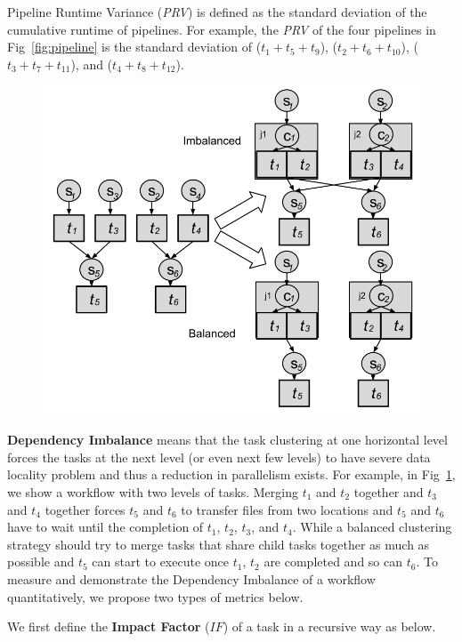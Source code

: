 Pipeline Runtime Variance ({\em PRV}) is defined as the standard deviation of the cumulative runtime of pipelines. For example, the {\em PRV} of the four pipelines in Fig~\ref{fig:pipeline} is the standard deviation of ($t_1+ t_5 +t_9$), ($t_2+t_6+t_{10}$), ($t_3 +t_7+t_{11}$), and ($t_4+t_8+t_{12}$).


\begin{figure}
\centering

  \includegraphics[width=0.8\linewidth]{figures/balance/dv.png}
  \label{fig:dv}
\end{figure}
\textbf{Dependency Imbalance} means that the task clustering at one horizontal level forces the tasks at the next level (or even next few levels) to have severe data locality problem and thus a reduction in parallelism exists. For example, in Fig~\ref{fig:dv}, we show a workflow with two levels of tasks. Merging $t_1$ and $t_2$ together and $t_3$ and $t_4$ together forces $t_5$ and $t_6$ to transfer files from two locations and $t_5$ and $t_6$ have to wait until the completion of $t_1$, $t_2$, $t_3$, and $t_4$.  While a balanced clustering strategy should try to merge tasks that share child tasks together as much as possible and $t_5$ can start to execute once $t_1$, $t_2$ are completed and so can $t_6$. To measure and demonstrate the Dependency Imbalance of a workflow quantitatively, we propose two types of metrics below. 



We first define the \textbf{Impact Factor} ($IF$) of a task in a recursive way as below. 

